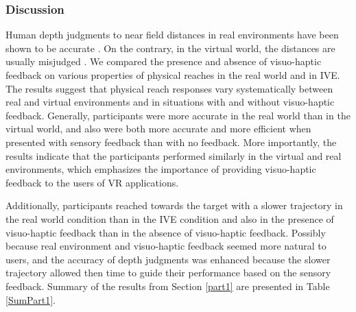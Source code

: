 \subsubsection{Discussion}  
Human depth judgments to near field distances in real environments have been shown to be accurate \cite{NAB+11}. On the contrary, in the virtual world, the distances are usually misjudged \cite{EAH+14}. We compared the presence and absence of visuo-haptic feedback on various properties of physical reaches in the real world and in IVE. The results suggest that physical reach responses vary systematically between real and virtual environments and in situations with and without visuo-haptic feedback. Generally, participants were more accurate in the real world than in the virtual world, and also were both more accurate and more efficient when presented with sensory feedback than with no feedback. More importantly, the results indicate that the participants performed similarly in the virtual and real environments, which emphasizes the importance of providing visuo-haptic feedback to the users of VR applications.

Additionally, participants reached towards the target with a slower trajectory in the real world condition than in the IVE condition and also in the presence of visuo-haptic feedback than in the absence of visuo-haptic feedback. Possibly because real environment and visuo-haptic feedback seemed more natural to users, and the accuracy of depth judgments was enhanced because the slower trajectory allowed then time to guide their performance based on the sensory feedback. Summary of the results from Section \ref{part1} are presented in Table \ref{SumPart1}. 



